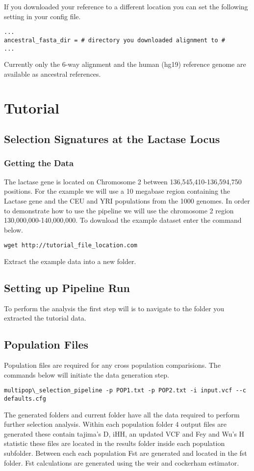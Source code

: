 \documentclass[a4paper,10pt]{article}
\begin{document}
If you downloaded your reference to a different location you can set the following setting in your config file.\\
\begin{verbatim}
...
ancestral_fasta_dir = # directory you downloaded alignment to #
...
\end{verbatim}

Currently only the 6-way alignment and the human (hg19) reference genome are available as ancestral references.
\section{Tutorial}
\subsection{Selection Signatures at the Lactase Locus}
\subsubsection{Getting the Data}
The lactase gene is located on Chromosome 2 between 136,545,410-136,594,750 positions. For the example we will use a 10 megabase region containing the Lactase gene and the CEU and YRI populations from the 1000 genomes. In order to demonstrate how to use the pipeline we will use the chromosome 2 region 130,000,000-140,000,000. To download the example dataset enter the command below. \\

\begin{verbatim}
wget http://tutorial_file_location.com 
\end{verbatim}

Extract the example data into a new folder.

\subsection{Setting up Pipeline Run}
To perform the analysis the first step will is to navigate to the folder you extracted the tutorial data.
\subsection{Population Files}
Population files are required for any cross population comparisions. The commands below will initiate the data generation step.\\
\begin{verbatim}
multipop\_selection_pipeline -p POP1.txt -p POP2.txt -i input.vcf --c defaults.cfg
\end{verbatim}
The generated folders and current folder have all the data required to perform further selection analysis. Within each population folder 4 output files are generated these contain tajima's D, iHH, an updated VCF and Fey and Wu's H statistic these files are located in the results folder inside each population subfolder. Between each each population Fst are generated and located in the fst folder. Fst calculations are generated using the weir and cockerham estimator.
\end{document}
